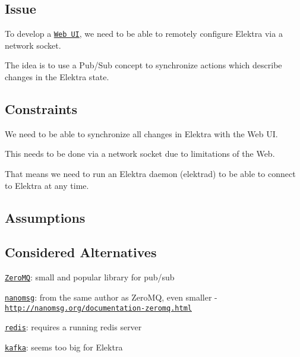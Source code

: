 \subsection*{Issue}

To develop a \href{https://github.com/ElektraInitiative/libelektra/issues/252}{\tt Web U\+I}, we need to be able to remotely configure Elektra via a network socket.

The idea is to use a Pub/\+Sub concept to synchronize actions which describe changes in the Elektra state.

\subsection*{Constraints}


\begin{DoxyItemize}
\item We need to be able to synchronize all changes in Elektra with the Web U\+I.
\item This needs to be done via a network socket due to limitations of the Web.
\item That means we need to run an Elektra daemon ({\ttfamily elektrad}) to be able to connect to Elektra at any time.
\end{DoxyItemize}

\subsection*{Assumptions}

\subsection*{Considered Alternatives}


\begin{DoxyItemize}
\item \href{http://zeromq.org/}{\tt Zero\+M\+Q}\+: small and popular library for pub/sub
\item \href{http://nanomsg.org/}{\tt nanomsg}\+: from the same author as Zero\+M\+Q, even smaller -\/ \href{http://nanomsg.org/documentation-zeromq.html}{\tt http\+://nanomsg.\+org/documentation-\/zeromq.\+html}
\item \href{http://redis.io/topics/pubsub}{\tt redis}\+: requires a running redis server
\item \href{http://kafka.apache.org/}{\tt kafka}\+: seems too big for Elektra
\end{DoxyItemize}

